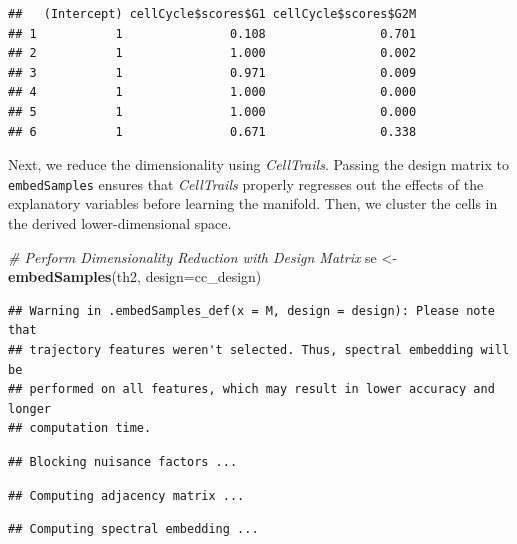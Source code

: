 \documentclass[]{book}
\newenvironment{Shaded}{\begin{snugshade}}{\end{snugshade}}
\newcommand{\KeywordTok}[1]{\textcolor[rgb]{0.13,0.29,0.53}{\textbf{#1}}}
\newcommand{\DataTypeTok}[1]{\textcolor[rgb]{0.13,0.29,0.53}{#1}}
\newcommand{\DecValTok}[1]{\textcolor[rgb]{0.00,0.00,0.81}{#1}}
\newcommand{\StringTok}[1]{\textcolor[rgb]{0.31,0.60,0.02}{#1}}
\newcommand{\CommentTok}[1]{\textcolor[rgb]{0.56,0.35,0.01}{\textit{#1}}}
\newcommand{\OperatorTok}[1]{\textcolor[rgb]{0.81,0.36,0.00}{\textbf{#1}}}
\newcommand{\NormalTok}[1]{#1}
\theoremstyle{definition}
\theoremstyle{definition}
\theoremstyle{definition}
\theoremstyle{remark}
\begin{document}
\begin{verbatim}
##   (Intercept) cellCycle$scores$G1 cellCycle$scores$G2M
## 1           1               0.108                0.701
## 2           1               1.000                0.002
## 3           1               0.971                0.009
## 4           1               1.000                0.000
## 5           1               1.000                0.000
## 6           1               0.671                0.338
\end{verbatim}

Next, we reduce the dimensionality using \emph{CellTrails}. Passing the
design matrix to \texttt{embedSamples} ensures that \emph{CellTrails}
properly regresses out the effects of the explanatory variables before
learning the manifold. Then, we cluster the cells in the derived
lower-dimensional space.

\begin{Shaded}
\begin{Highlighting}[]
\CommentTok{# Perform Dimensionality Reduction with Design Matrix}
\NormalTok{se <-}\StringTok{ }\KeywordTok{embedSamples}\NormalTok{(th2, }\DataTypeTok{design=}\NormalTok{cc_design)}
\end{Highlighting}
\end{Shaded}

\begin{verbatim}
## Warning in .embedSamples_def(x = M, design = design): Please note that
## trajectory features weren't selected. Thus, spectral embedding will be
## performed on all features, which may result in lower accuracy and longer
## computation time.
\end{verbatim}

\begin{verbatim}
## Blocking nuisance factors ...
\end{verbatim}

\begin{verbatim}
## Computing adjacency matrix ...
\end{verbatim}

\begin{verbatim}
## Computing spectral embedding ...
\end{verbatim}

\begin{Shaded}
\end{Shaded}
\end{document}
